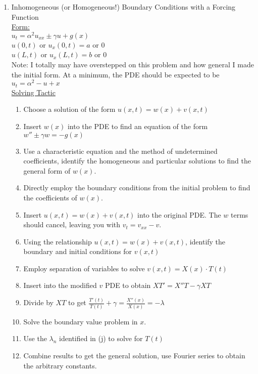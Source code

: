\documentclass{article}
\begin{document}
\begin{enumerate}
\pagebreak
    \item Inhomogeneous (or Homogeneous!) Boundary Conditions with a Forcing Function
    \medskip\\
    \underline{Form:}
    \medskip\\
    $u_t = \alpha^2 u_{xx} \pm \gamma u + g(x)$
    \smallskip\\
    $u(0,t) \textrm{ or } u_x(0,t) = a$ or 0\\
    $u(L,t) \textrm{ or } u_x(L,t) = b$ or 0
    \medskip\\
    Note: I totally may have overstepped on this problem and how general I made the initial form. At a minimum, the PDE should be expected to be $u_t = \alpha^2 - u + x$
    \medskip\\
    \underline{Solving Tactic}
    \begin{enumerate}
        \item Choose a solution of the form $u(x,t) = w(x) + v(x,t)$
        \item Insert $w(x)$ into the PDE to find an equation of the form $w'' \pm \gamma w = -g(x)$
        \item Use a characteristic equation and the method of undetermined coefficients, identify the homogeneous and particular solutions to find the general form of $w(x)$.
        \item Directly employ the boundary conditions from the initial problem to find the coefficients of $w(x)$.
        \item Insert $u(x,t) = w(x) + v(x,t)$ into the original PDE. The $w$ terms should cancel, leaving you with $v_t = v_{xx} - v$.
        \item Using the relationship $u(x,t) = w(x) + v(x,t)$, identify the boundary and initial conditions for $v(x,t)$
        \item Employ separation of variables to solve $v(x,t) = X(x)\cdot T(t)$
        \item Insert into the modified $v$ PDE to obtain $XT' = X''T - \gamma XT$
        \item Divide by $XT$ to get $\frac{T'(t)}{T(t)} + \gamma = \frac{X''(x)}{X(x)} = -\lambda$
        \item Solve the boundary value problem in $x$.
        \item Use the $\lambda_n$ identified in (j) to solve for $T(t)$
        \item Combine results to get the general solution, use Fourier series to obtain the arbitrary constants.
    \end{enumerate}
    

\end{enumerate}
\end{document}
